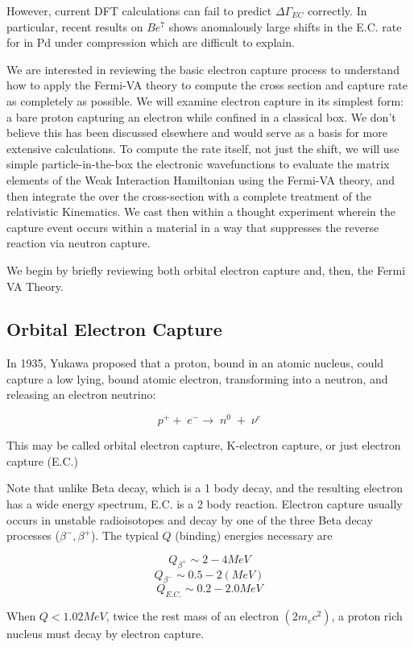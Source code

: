 \documentclass[%
 aip,
 jmp,%
 amsmath,amssymb,
 reprint,%
]{revtex4-1}
\begin{document}
However, current DFT calculations can fail to predict $\Delta\Gamma_{EC}$ correctly.    In particular, recent results on $Be^{7}$ shows anomalously large shifts in the E.C. rate for in Pd under compression which are difficult to explain.\cite{PhysRevC.101.035801}

We are interested in reviewing the basic  electron capture process to  understand how to apply the Fermi-VA theory to compute the cross section and capture rate as completely as possible.  We will examine electron capture in its simplest form:  a bare proton capturing an electron while confined in a classical box.   We don't believe this has been discussed elsewhere and would serve as a basis for more extensive calculations.    To compute the rate itself, not just the shift,  we will use simple particle-in-the-box the electronic wavefunctions to evaluate the matrix elements of the Weak Interaction Hamiltonian using the Fermi-VA theory, and then integrate the over the cross-section with a complete treatment of the relativistic Kinematics.  We cast then within a thought experiment wherein the capture event occurs within a material in a way that suppresses the reverse reaction via neutron capture.

We begin by briefly reviewing both orbital electron capture and, then, the Fermi VA Theory.

\subsection{Orbital Electron Capture}
In 1935, Yukawa proposed that a proton, bound in an atomic nucleus,  could capture a low lying, bound atomic electron, transforming into a neutron, and releasing an electron neutrino:


$$p^{+}+\;e^{-}\rightarrow\;n^{0}\;+\;\nu^{e}$$

This may be called orbital electron capture, K-electron capture, or just electron capture (E.C.) 

Note that unlike Beta decay, which is a 1 body decay, and the resulting electron has a wide energy spectrum, E.C. is a 2 body reaction. Electron capture usually occurs in unstable radioisotopes and decay by one of the three Beta decay processes ($\beta^{-}, \beta^{+}$). The typical $Q$ (binding) energies necessary are 

$$Q_{\beta^{+}}\sim2-4{MeV}$$
$$Q_{\beta^{-}}\sim0.5-2(MeV)$$
$$Q_{E.C.}\sim0.2-2.0{MeV}$$

When $Q<1.02{MeV}$, twice the rest mass of an electron $(2m_{e}c^{2})$, a proton rich nucleus must decay by electron capture.
\end{document}
